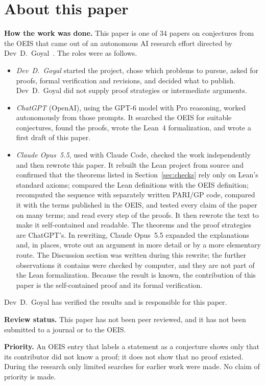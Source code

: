 \documentclass[11pt,a4paper]{article}
\theoremstyle{definition}
\theoremstyle{remark}
\newcommand{\para}[1]{\par\medskip\noindent\textbf{#1}\enspace}
\begin{document}
\section*{About this paper}\label{sec:about}
\para{How the work was done.}
This paper is one of 34 papers on conjectures from the OEIS that came out of an autonomous AI research effort directed
by Dev~D.~Goyal~\cite{repo}. The roles were as follows.
\begin{itemize}
\item \emph{Dev~D.~Goyal} started the project, chose which problems to pursue, asked for proofs, formal verification and
revisions, and decided what to publish. Dev~D.~Goyal did not supply proof strategies or intermediate arguments.
\item \emph{ChatGPT} (OpenAI), using the GPT-6 model with Pro reasoning, worked autonomously from those prompts. It
searched the OEIS for suitable conjectures, found the proofs, wrote the Lean~4 formalization, and wrote a first draft
of this paper.
\item \emph{Claude Opus~5.5}, used with Claude Code, checked the work independently and then rewrote this paper. It
rebuilt the Lean project from source and confirmed that the theorems listed in Section~\ref{sec:checks} rely only on
Lean's standard axioms; compared the Lean definitions with the OEIS definition; recomputed the sequence with separately
written PARI/GP code, compared it with the terms published in the OEIS, and tested every claim of the paper on many
terms; and read every step of the proofs. It then rewrote the text to make it self-contained and readable. The
theorems and the proof strategies are ChatGPT's. In rewriting, Claude Opus~5.5 expanded the explanations and, in
places, wrote out an argument in more detail or by a more elementary route. The Discussion section was written during
this rewrite; the further observations it contains were checked by computer, and they are not part of the Lean
formalization. Because the result is known, the contribution of this paper is the self-contained
proof and its formal verification.
\end{itemize}
Dev~D.~Goyal has verified the results and is responsible for this paper.

\para{Review status.} This paper has not been peer reviewed, and it has not been submitted to a journal or to the OEIS.

\para{Priority.} An OEIS entry that labels a statement as a conjecture shows only that its contributor did not know
a proof; it does not show that no proof existed. During the research only limited searches for earlier work were
made. No claim of priority is made.
\end{document}
